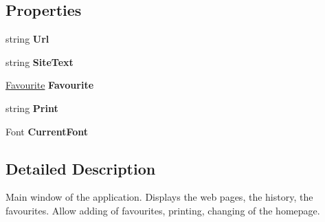 \subsection*{Properties}
\begin{DoxyCompactItemize}
\item 
\hypertarget{class_assessment___two_1_1_main_window_aebf7a735f834fd0c6ace4851a4bec77a}{
string {\bfseries Url}}
\label{class_assessment___two_1_1_main_window_aebf7a735f834fd0c6ace4851a4bec77a}

\item 
\hypertarget{class_assessment___two_1_1_main_window_a6547d6465130b507bf6ad5b4efb51b45}{
string {\bfseries SiteText}}
\label{class_assessment___two_1_1_main_window_a6547d6465130b507bf6ad5b4efb51b45}

\item 
\hypertarget{class_assessment___two_1_1_main_window_a81d535c24a20c85369b833e44c258537}{
\hyperlink{class_assessment___two___logic_1_1_model_1_1_favourite}{Favourite} {\bfseries Favourite}}
\label{class_assessment___two_1_1_main_window_a81d535c24a20c85369b833e44c258537}

\item 
\hypertarget{class_assessment___two_1_1_main_window_af8c86a22a0a1f640ff31ceeeeaa46c70}{
string {\bfseries Print}}
\label{class_assessment___two_1_1_main_window_af8c86a22a0a1f640ff31ceeeeaa46c70}

\item 
\hypertarget{class_assessment___two_1_1_main_window_a1c35edeb535a3a0e14be101d0995281e}{
Font {\bfseries CurrentFont}}
\label{class_assessment___two_1_1_main_window_a1c35edeb535a3a0e14be101d0995281e}

\end{DoxyCompactItemize}


\subsection{Detailed Description}
Main window of the application. Displays the web pages, the history, the favourites. Allow adding of favourites, printing, changing of the homepage. 

